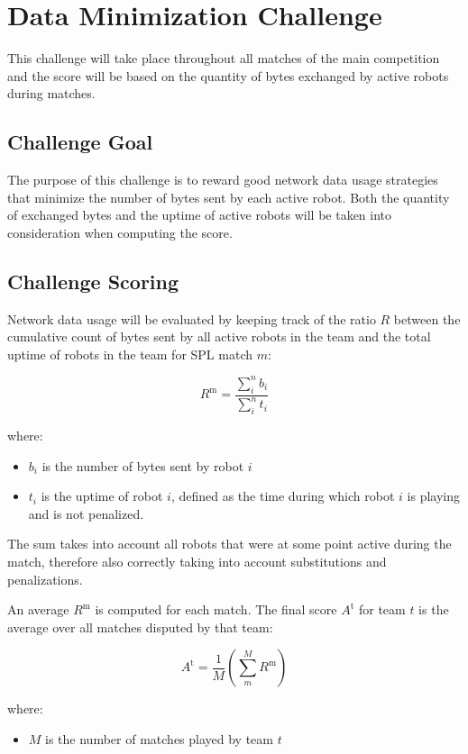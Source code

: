 \section{Data Minimization Challenge} %
This challenge will take place throughout all matches of the main competition and the score will be based on the quantity of bytes exchanged by active robots during matches. 


\subsection{Challenge Goal}
The purpose of this challenge is to reward good network data usage strategies that minimize the number of bytes sent by each active robot. Both the quantity of exchanged bytes and the uptime of active robots will be taken into consideration when computing the score.

\subsection{Challenge Scoring}
Network data usage will be evaluated by keeping track of the ratio $R$ between the cumulative count of bytes sent by all active robots in the team and the total uptime of robots in the team for SPL match $m$:

$$ R^\text{m} = \frac{\sum_{i}^n b_i}{\sum_{i}^n t_i} $$

where:
\begin{itemize}
    \item $b_i$ is the number of bytes sent by robot $i$
    \item $t_i$ is the uptime of robot $i$, defined as the time during which robot $i$ is playing and is not penalized.
\end{itemize}
The sum takes into account all robots that were at some point active during the match, therefore also correctly taking into account substitutions and penalizations.

An average $R^\text{m}$ is computed for each match. The final score $A^\text{t}$ for team $t$ is the average over all matches disputed by that team:

$$ A^\text{t} = \frac{1}{M} \left( \sum_{m}^M R^\text{m} \right) $$

where:
\begin{itemize}
    \item $M$ is the number of matches played by team $t$
\end{itemize}


